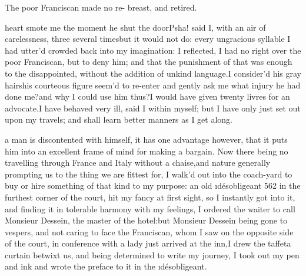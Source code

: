 \documentclass[twoside]{article}
\begin{document}
The poor Franciscan made no re-
breast, and retired.





 heart smote me the moment he shut the door\tsk Psha! said I, with an air
of carelessness, three several times\tsk but it would not do: every
ungracious syllable I had utter’d crowded back into my imagination: I
reflected, I had no right over the poor Franciscan, but to deny him; and
that the punishment of that was enough to the disappointed, without the
addition of unkind language.\tsk I consider’d his gray hairs\tsk his courteous
figure seem’d to re-enter and gently ask me what injury he had done
me?\tsk and why I could use him thus?\tsk I would have given twenty livres for an
advocate.\tsk I have behaved very ill, said I within myself; but I have only
just set out upon my travels; and shall learn better manners as I get
along.






 a man is discontented with himself, it has one advantage however,
that it puts him into an excellent frame of mind for making a bargain.
Now there being no travelling through France and Italy without a
chaise,\tsk and nature generally prompting us to the thing we are fittest
for, I walk’d out into the coach-yard to buy or hire something of that
kind to my purpose: an old \i{désobligeant} {562} in the furthest corner of
the court, hit my fancy at first sight, so I instantly got into it, and
finding it in tolerable harmony with my feelings, I ordered the waiter to
call Monsieur Dessein, the master of the hotel:\tsk but Monsieur Dessein
being gone to vespers, and not caring to face the Franciscan, whom I saw
on the opposite side of the court, in conference with a lady just arrived
at the inn,\tsk I drew the taffeta curtain betwixt us, and being determined
to write my journey, I took out my pen and ink and wrote the preface to
it in the \i{désobligeant}.




\end{document}
